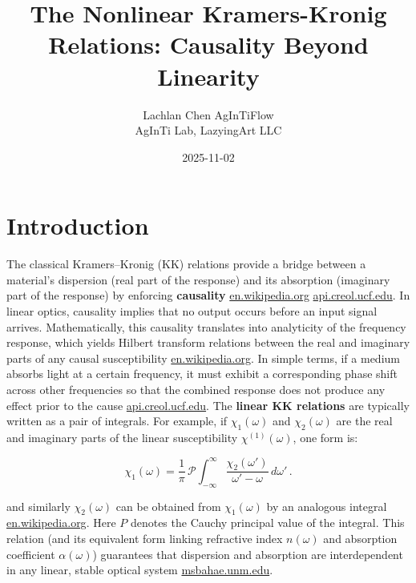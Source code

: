\documentclass[11pt,a4paper]{article}
\title{The Nonlinear Kramers-Kronig Relations: Causality Beyond Linearity}
\author{\begin{tabular}{c}Lachlan Chen \quad AgInTiFlow\\AgInTi Lab, LazyingArt LLC\end{tabular}}
\date{2025-11-02}
\begin{document}
\maketitle


\section{Introduction}

The classical Kramers–Kronig (KK) relations provide a bridge between a material’s dispersion (real part of the response) and its absorption (imaginary part of the response) by enforcing \textbf{causality} \href{https://en.wikipedia.org/wiki/Kramers%E2%80%93Kronig_relations}{en.wikipedia.org} \href{https://api.creol.ucf.edu/Publications/3865.pdf}{api.creol.ucf.edu}. In linear optics, causality implies that no output occurs before an input signal arrives. Mathematically, this causality translates into analyticity of the frequency response, which yields Hilbert transform relations between the real and imaginary parts of any causal susceptibility \href{https://en.wikipedia.org/wiki/Kramers%E2%80%93Kronig_relations}{en.wikipedia.org}. In simple terms, if a medium absorbs light at a certain frequency, it must exhibit a corresponding phase shift across other frequencies so that the combined response does not produce any effect prior to the cause \href{https://api.creol.ucf.edu/Publications/3865.pdf}{api.creol.ucf.edu}. The \textbf{linear KK relations} are typically written as a pair of integrals. For example, if $\chi_1(\omega)$ and $\chi_2(\omega)$ are the real and imaginary parts of the linear susceptibility $\chi^{(1)}(\omega)$, one form is:

$$
\chi_1(\omega) = \frac{1}{\pi}\, \mathcal{P} \! \int_{-\infty}^{\infty} \frac{\chi_2(\omega')}{\omega' - \omega}\, d\omega'\,.
$$

and similarly $\chi_2(\omega)$ can be obtained from $\chi_1(\omega)$ by an analogous integral \href{https://en.wikipedia.org/wiki/Kramers%E2%80%93Kronig_relations}{en.wikipedia.org}. Here $P$ denotes the Cauchy principal value of the integral. This relation (and its equivalent form linking refractive index $n(\omega)$ and absorption coefficient $\alpha(\omega)$) guarantees that dispersion and absorption are interdependent in any linear, stable optical system \href{https://msbahae.unm.edu/Courses/568%20Nonlinear%20Optics/OSA-Handbook%20of%20Optics-IV-Ch17.pdf}{msbahae.unm.edu}.
\end{document}
